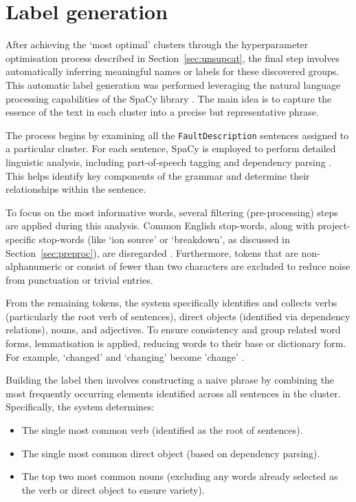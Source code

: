 \documentclass[10pt,oneside]{report}
\begin{document}
\section{Label generation}

After achieving the `most optimal’ clusters through the hyperparameter optimisation process described in Section~\ref{sec:unsupcat}, the final step involves automatically inferring meaningful names or labels for these discovered groups. This automatic label generation was performed leveraging the natural language processing capabilities of the SpaCy library \cite{spacy2}. The main idea is to capture the essence of the text in each cluster into a precise but representative phrase.

The process begins by examining all the \texttt{FaultDescription} sentences assigned to a particular cluster. For each sentence, SpaCy is employed to perform detailed linguistic analysis, including part-of-speech tagging and dependency parsing \cite{tabassum2020survey}. This helps identify key components of the grammar and determine their relationships within the sentence.

To focus on the most informative words, several filtering (pre-processing) steps are applied during this analysis. Common English stop-words, along with project-specific stop-words (like `ion source' or `breakdown', as discussed in Section~\ref{sec:preproc}), are disregarded \cite{tabassum2020survey}. Furthermore, tokens that are non-alphanumeric or consist of fewer than two characters are excluded to reduce noise from punctuation or trivial entries.

From the remaining tokens, the system specifically identifies and collects verbs (particularly the root verb of sentences), direct objects (identified via dependency relations), nouns, and adjectives. To ensure consistency and group related word forms, lemmatisation is applied, reducing words to their base or dictionary form. For example, `changed' and `changing' become 'change' \cite{tabassum2020survey}.

Building the label then involves constructing a naive phrase by combining the most frequently occurring elements identified across all sentences in the cluster. Specifically, the system determines:
\begin{itemize}
    \item The single most common verb (identified as the root of sentences).
    \item The single most common direct object (based on dependency parsing).
    \item The top two most common nouns (excluding any words already selected as the verb or direct object to ensure variety).
\end{itemize}
\end{document}
